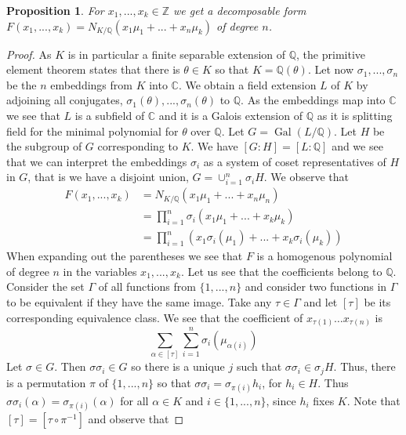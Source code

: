 \documentclass{article}
\DeclareMathOperator{\Gal}{Gal}
\newtheorem{proposition}{Proposition}[section]
\newcommand{\mbb}[1]{\mathbb{#1}}
\numberwithin{equation}{section}
\begin{document}
\begin{proposition}
    For $x_1, ..., x_k \in \mbb Z$ we get a decomposable form $F(x_1, ..., x_k) = N_{K / \mbb Q}(x_1 \mu_1 + ... + x_n \mu_k)$ of degree $n$. %
\end{proposition}
\begin{proof}
    
As $K$ is in particular a finite separable extension of $\mbb Q$, the primitive element theorem states that there is $\theta \in K$ so that $K = \mbb Q(\theta)$. Let now $\sigma_1, ..., \sigma_n$ be the $n$ embeddings from $K$ into $\mbb C$. We obtain a field extension $L$ of $K$ by adjoining all conjugates, $\sigma_1(\theta), ..., \sigma_n(\theta)$ to $\mbb Q$. As the embeddings map into $\mbb C$ we see that $L$ is a subfield of $\mbb C$ and it is a Galois extension of $\mbb Q$ as it is splitting field for the minimal polynomial for $\theta$ over $\mbb Q$. Let $G = \Gal(L/\mbb Q)$. Let $H$ be the subgroup of $G$ corresponding to $K$. We have $[G : H] = [L : \mbb Q]$ and we see that we can interpret the embeddings $\sigma_i$ as a system of coset representatives of $H$ in $G$, that is we have a disjoint union, $G = \cup_{i = 1}^n \sigma_i H$. We observe that
\begin{align*}
    F(x_1, ..., x_k) &= N_{K /\mbb Q}(x_1 \mu_1 + ... + x_n \mu_n) 
    \\ &= \prod_{i = 1}^n \sigma_i(x_1 \mu_1 + ... + x_k \mu_k)                         \\
                     & = \prod_{i = 1}^n \left(x_1 \sigma_i(\mu_1) + ... + x_k \sigma_i(\mu_k) \right)
\end{align*}
When expanding out the parentheses we see that $F$ is a homogenous polynomial of degree $n$ in the variables $x_1, ..., x_k$. Let us see that the coefficients belong to $\mbb Q$. Consider the set $\Gamma$ of all functions from $\{1, ..., n\}$ and consider two functions in $\Gamma$ to be equivalent if they have the same image. Take any $\tau \in \Gamma$ and let $[\tau]$ be its corresponding equivalence class. We see that the coefficient of $x_{\tau(1)} \ldots x_{\tau(n)}$ is 
\begin{equation}
    \sum_{\alpha \in [\tau]} \sum_{i=1}^n \sigma_i(\mu_{\alpha(i)})
\end{equation}
Let $\sigma \in G$. Then $\sigma \sigma_i \in G$ so there is a unique $j$ such that $\sigma \sigma_i \in \sigma_j H$. Thus, there is a permutation $\pi$ of $\{1, ..., n\}$ so that $\sigma \sigma_{i}= \sigma_{\pi(i)}h_i$, for $h_i \in H$. Thus $\sigma \sigma_{i}(\alpha) = \sigma_{\pi(i)}(\alpha)$ for all $\alpha \in K$ and $i \in \{1,...,n\}$, since $h_i$ fixes $K$. Note that $[\tau]= [\tau \circ \pi^{-1}]$ and observe that

\end{proof}
\end{document}
